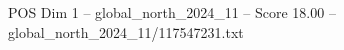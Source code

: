 \begin{textsample}{POS Dim 1 – global\_north\_2024\_11 – Score 18.00 – global\_north\_2024\_11/117547231.txt}
\end{textsample}
